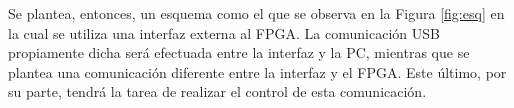Se plantea, entonces, un esquema como el que se observa en la Figura \ref{fig:esq} en la cual se utiliza una interfaz externa al FPGA. La comunicación USB propiamente dicha será efectuada entre la interfaz y la PC, mientras que se plantea una comunicación diferente entre la interfaz y el FPGA. Este último, por su parte, tendrá la tarea de realizar el control de esta comunicación.\\


%
%
%

